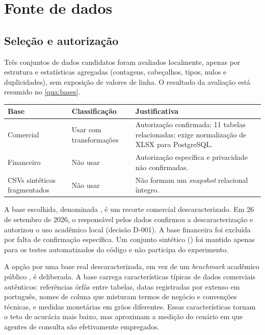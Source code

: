 \section{Fonte de dados}
\label{sec:fonte-dados}

\subsection{Seleção e autorização}
\label{sec:selecao-base}

Três conjuntos de dados candidatos foram avaliados localmente, apenas por
estrutura e estatísticas agregadas (contagens, cabeçalhos, tipos, nulos e
duplicidades), sem exposição de valores de linha. O resultado da avaliação
está resumido no \autoref{qua:bases}.

\begin{quadro}[htb]
  \centering
  \caption{Classificação das bases candidatas}
  \label{qua:bases}
  \begin{tabularx}{\textwidth}{|l|l|X|}
    \hline
    \textbf{Base} & \textbf{Classificação} & \textbf{Justificativa} \\ \hline
    Comercial & Usar com transformações & Autorização confirmada; 11 tabelas
      relacionadas; exige normalização de XLSX para PostgreSQL. \\ \hline
    Financeiro & Não usar & Autorização específica e privacidade não
      confirmadas. \\ \hline
    CSVs sintéticos fragmentados & Não usar & Não formam um
      \textit{snapshot} relacional íntegro. \\ \hline
  \end{tabularx}
\end{quadro}

A base escolhida, denominada , é um recorte comercial
descaracterizado. Em 26 de setembro de 2026, o responsável pelos dados
confirmou a descaracterização e autorizou o uso acadêmico local
(decisão D-001). A base financeira foi excluída por falta de confirmação
específica. Um conjunto sintético () foi mantido
apenas para os testes automatizados do código e não participa do
experimento.

A opção por uma base real descaracterizada, em vez de um \textit{benchmark}
acadêmico público \cite{yu2018spider,li2023bird}, é deliberada. A base carrega
características típicas de dados comerciais autênticos: referências órfãs
entre tabelas, datas registradas por extenso em português, nomes de coluna
que misturam termos de negócio e convenções técnicas, e medidas
monetárias em grãos diferentes. Essas características tornam o teto de
acurácia mais baixo, mas aproximam a medição do cenário em que agentes de
consulta são efetivamente empregados.

